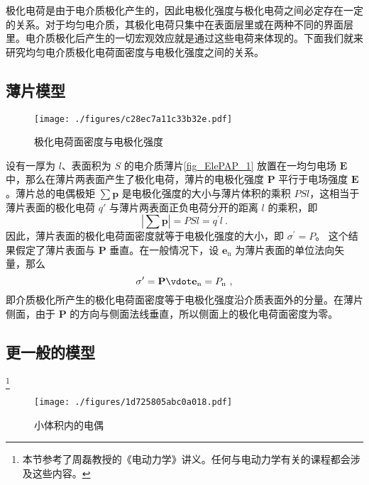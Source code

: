 


极化电荷是由于电介质极化产生的，因此电极化强度与极化电荷之间必定存在一定的关系。对于均匀电介质，其极化电荷只集中在表面层里或在两种不同的界面层里。电介质极化后产生的一切宏观效应就是通过这些电荷来体现的。下面我们就来研究均匀电介质极化电荷面密度与电极化强度之间的关系。

\subsection{薄片模型}
\begin{figure}[ht]
\centering
\texttt{[image: ./figures/c28ec7a11c33b32e.pdf]}
\caption{极化电荷面密度与电极化强度} \label{fig_ElePAP_1}
\end{figure}
设有一厚为 $l$、表面积为 $S $ 的电介质薄片\autoref{fig_ElePAP_1} 放置在一均匀电场 $\mathbf E $ 中，那么在薄片两表面产生了极化电荷，薄片的电极化强度 $\mathbf P $ 平行于电场强度 $\mathbf E$。薄片总的电偶极矩 $\sum \mathbf p$ 是电极化强度的大小与薄片体积的乘积 $PSl$，这相当于薄片表面的极化电荷 $q' $ 与薄片两表面正负电荷分开的距离 $l $ 的乘积，即
\begin{equation}
\left|\sum \mathbf p\right|=P S l=q^{\prime} l~.
\end{equation}
因此，薄片表面的极化电荷面密度就等于电极化强度的大小，即 $\sigma^{\prime}=P$。
这个结果假定了薄片表面与 $\mathbf P $ 垂直。在一般情况下，设 $\mathbf e_\mathrm{n} $ 为薄片表面的单位法向矢量，那么
\begin{equation}
\sigma^{\prime}=\mathbf P \vdot \mathbf e_{\mathrm{n}}=P_{\mathrm{n}}~,
\end{equation}
即介质极化所产生的极化电荷面密度等于电极化强度沿介质表面外的分量。在薄片侧面，由于 $\mathbf P $ 的方向与侧面法线垂直，所以侧面上的极化电荷面密度为零。

\subsection{更一般的模型}
\footnote{本节参考了周磊教授的《电动力学》讲义。任何与电动力学有关的课程都会涉及这些内容。}
\begin{figure}[ht]
\centering
\texttt{[image: ./figures/1d725805abc0a018.pdf]}
\caption{小体积内的电偶} \label{fig_ElePAP_2}
\end{figure}


